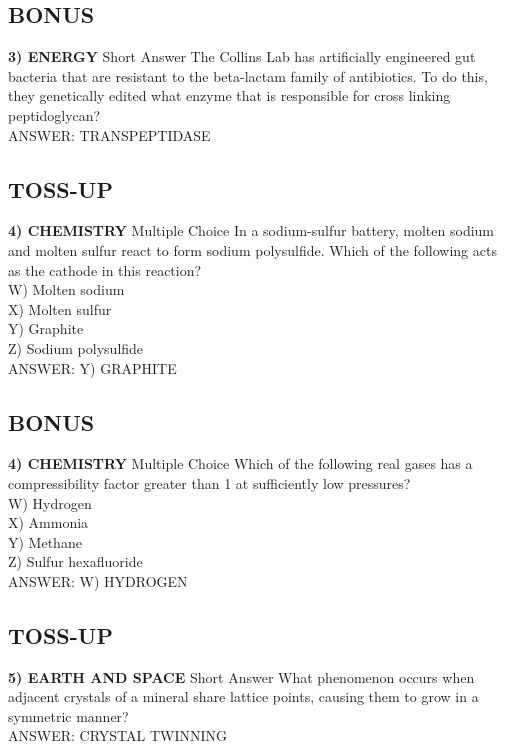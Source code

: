 \documentclass{article}
\begin{document}
\subsection*{BONUS}
\textbf{3) ENERGY} Short Answer The Collins Lab has artificially engineered gut bacteria that are resistant to the beta-lactam family of antibiotics. To do this, they genetically edited what enzyme that is responsible for cross linking peptidoglycan?
\\ANSWER: TRANSPEPTIDASE

\subsection*{TOSS-UP}
\textbf{4) CHEMISTRY} Multiple Choice In a sodium-sulfur battery, molten sodium and molten sulfur react to form sodium polysulfide. Which of the following acts as the cathode in this reaction?
\\W) Molten sodium
\\X) Molten sulfur
\\Y) Graphite
\\Z) Sodium polysulfide
\\ANSWER: Y) GRAPHITE

\subsection*{BONUS}
\textbf{4) CHEMISTRY} Multiple Choice Which of the following real gases has a compressibility factor greater than 1 at sufficiently low pressures?
\\W) Hydrogen
\\X) Ammonia
\\Y) Methane
\\Z) Sulfur hexafluoride
\\ANSWER: W) HYDROGEN

\subsection*{TOSS-UP}
\textbf{5) EARTH AND SPACE} Short Answer What phenomenon occurs when adjacent crystals of a mineral share lattice points, causing them to grow in a symmetric manner?
\\ANSWER: CRYSTAL TWINNING
\end{document}
